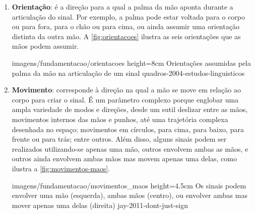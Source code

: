 \begin{enumerate}
    \item \textbf{Orientação}: é a direção para a qual a palma da mão aponta durante a articulação do sinal. Por exemplo, a palma pode estar voltada para o corpo ou para fora, para o chão ou para cima, ou ainda assumir uma orientação distinta da outra mão. A \autoref{fig:orientacoes} ilustra as seis orientações que as mãos podem assumir.
    
        {imagens/fundamentacao/orientacoes} %
        {height=8cm} %
        {Orientações assumidas pela palma da mão na articulação de um sinal} %
        {quadros-2004-estudos-linguisticos} %
    





    \item \textbf{Movimento}: corresponde à direção na qual a mão se move em relação ao corpo para criar o sinal. É um parâmetro complexo porque englobar uma ampla variedade de modos e direções, desde um sutil deslizar entre as mãos, movimentos internos das mãos e punhos, até uma trajetória complexa desenhada no espaço; movimentos em círculos, para cima, para baixo, para frente ou para trás; entre outros.
    Além disso, alguns sinais podem ser realizados utilizando-se apenas uma mão, outros envolvem ambas as mãos, e outros ainda envolvem ambas mãos mas movem apenas uma delas, como ilustra a \autoref{fig:movimentos-maos}.

        {imagens/fundamentacao/movimentos_maos} %
        {height=4.5cm} %
        {Os sinais podem envolver uma mão (esquerda), ambas mãos (centro), ou envolver ambas mas mover apenas uma delas (direita)} %
        {jay-2011-dont-just-sign} %

 

\end{enumerate}

